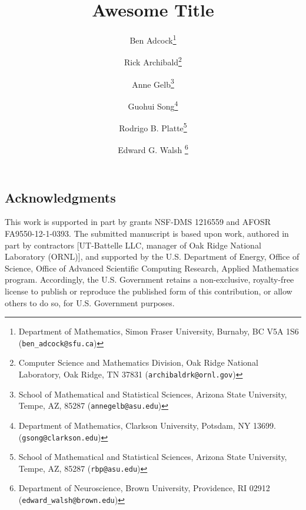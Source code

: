 \documentclass[smallextended]{svjour3}
\title{Awesome Title}
\author{Ben Adcock\thanks{Department of Mathematics, Simon Fraser University, Burnaby, BC V5A 1S6 ({\tt ben\_adcock@sfu.ca})}  \and
	Rick Archibald\thanks{Computer Science and Mathematics Division, Oak Ridge National Laboratory, Oak Ridge, TN 37831 ({\tt archibaldrk@ornl.gov})}  \and
        Anne Gelb\thanks{School of Mathematical and Statistical Sciences, Arizona State University, Tempe, AZ, 85287 ({\tt annegelb@asu.edu})}\and
        Guohui Song\thanks{Department of Mathematics, Clarkson University, Potsdam, NY 13699. ({\tt gsong@clarkson.edu})} \and 
        Rodrigo B. Platte\thanks{School of Mathematical and Statistical Sciences, Arizona State University, Tempe, AZ, 85287 ({\tt rbp@asu.edu})} \and
        Edward G. Walsh \thanks{Department of Neuroscience, Brown University, Providence, RI 02912 ({\tt edward\_walsh@brown.edu})}}
\begin{document}
\newtheorem{thm4}{Theorem}
\newtheorem{thm5}{Theorem}
\newtheorem{thm}{Theorem}
\newtheorem{defn}[thm5]{Definition}
\newtheorem{algorithm}{Algorithm}

\maketitle










\subsection*{Acknowledgments}
\label{sect:acks}
This work is supported in part by grants NSF-DMS 1216559 and AFOSR FA9550-12-1-0393.   The submitted manuscript is based upon work, authored in part by contractors [UT-Battelle LLC, manager of Oak Ridge National Laboratory (ORNL)], and supported by the U.S. Department of Energy, Office of Science, Office of Advanced Scientific Computing Research, Applied Mathematics program. Accordingly, the U.S. Government retains a non-exclusive,  royalty-free license to publish or reproduce the published form of this contribution, or allow others to do so, for U.S. Government purposes.



\end{document}
